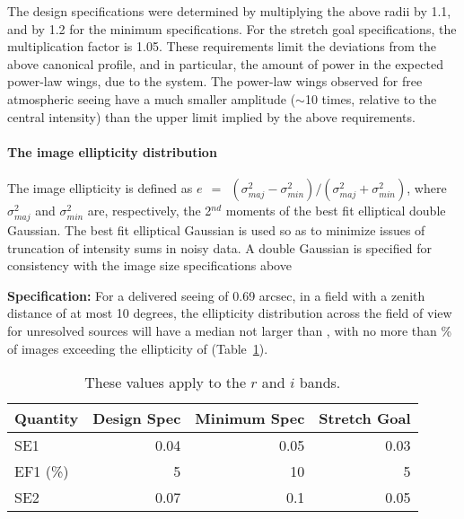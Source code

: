 The design specifications were determined by multiplying the above radii by
1.1, and by 1.2 for the minimum specifications.  For the stretch goal
specifications, the multiplication factor is 1.05.  These requirements
limit the deviations from the above canonical profile, and in particular,
the amount of power in the expected power-law wings, due to the system. The
power-law wings observed for free atmospheric seeing have a much smaller
amplitude ($\sim$10 times, relative to the central intensity) than the
upper limit implied by the above requirements.




\paragraph{The image ellipticity distribution\\}

The image ellipticity is defined as $e ~~=~~ (\sigma^{2}_{maj} -
\sigma^{2}_{min}) / (\sigma^{2}_{maj} + \sigma^{2}_{min}) $, where
$\sigma^{2}_{maj}$ and $\sigma^{2}_{min}$ are, respectively, the
2$^{nd}$ moments of the best fit elliptical double Gaussian.  The best
fit elliptical Gaussian is used so as to minimize issues of truncation
of intensity sums in noisy data.  A double Gaussian is specified for consistency
with the image size specifications above 

{\bf Specification:} For a delivered seeing of 0.69 arcsec, in a field
with a zenith distance of at most 10 degrees, the ellipticity
distribution across the field of view for unresolved sources will have
a median not larger than
,
with no more than
\% of images exceeding the ellipticity of
(Table~\ref{TellipS}).

\begin{table}[h]
\begin{tabular}{|l|r|r|r|}
\hline
Quantity       & Design Spec & Minimum Spec & Stretch Goal \\
\hline
      SE1      &    0.04      &     0.05     &       0.03    \\
      EF1 (\%) &      5       &      10      &         5     \\
      SE2      &    0.07      &     0.1      &       0.05    \\
\hline
\end{tabular}
\caption{These values apply to the $r$ and $i$ bands.}
\label{TellipS}
\end{table}

